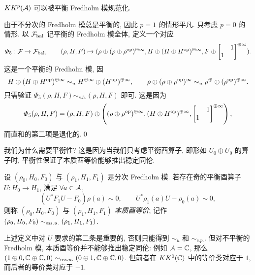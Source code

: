 \begin{Lemma}\label{len:4.1-平衡条件}
	$ KK^p(\mathcal{A}) $ 可以被平衡 Fredholm 模规范化.
\end{Lemma}
\begin{Proof}
	由于不分次的 Fredholm 模总是平衡的, 因此 $ p=1 $ 的情形平凡. 只考虑 $ p=0 $ 的情形. 以 $ \mathcal{F}_{\text{bal}} $ 记平衡的 Fredholm 模全体, 定义一个对应
	\[
		\varPhi_5 : \CF\to\CF_{\text{bal}},\qquad (\rho, H, F)\mapsto(\rho\oplus(\rho\oplus\rho^{\op})^{\oplus\infty}, H\oplus(H\oplus H^{\op})^{\oplus\infty}, F\oplus\mqty[ & 1 \\ 1 &]^{\oplus\infty}).
	\]
	这是一个平衡的 Fredholm 模, 因
	\[
		H\oplus(H\oplus H^{\text{op}})^{\oplus\infty}\sim_u H^{\oplus\infty}\oplus(H^{\text{op}})^{\oplus\infty},\qquad \rho\oplus(\rho\oplus\rho^{\text{op}})^{\infty}\sim_u\rho^{\oplus}\oplus(\rho^{\text{op}})^{\oplus\infty}.
	\]
	只需验证 $ \varPhi_5(\rho, H, F)\sim_{s.h.}(\rho, H, F) $ 即可. 这是因为
	\[
		\varPhi_5(\rho, H, F)=(\rho, H, F)\oplus\left((\rho\oplus\rho^{\op})^{\oplus\infty}, (H\oplus H^{\op})^{\oplus\infty}, \mqty[ & 1 \\ 1 &]^{\oplus\infty}\right),
	\]
	而直和的第二项是退化的.\qed
\end{Proof}

我们为什么需要平衡性? 这是因为当我们只考虑平衡酉算子, 即形如 $ U_0\oplus U_0 $ 的算子时, 平衡性保证了本质酉等价能够推出稳定同伦.

\begin{Definition}[本质酉等价]
	设 $ (\rho_0, H_0, F_0) $ 与 $ (\rho_1, H_1, F_1) $ 是分次 Fredholm 模. 若存在奇的平衡酉算子 $ U : H_0\to H_1 $, 满足 $ \forall a\in\mathcal{A} $,
	\[
		(U^*F_1U-F_0)\rho(a)\sim 0,\qquad U^*\rho_1(a)U-\rho_0(a)\sim 0,
	\]
	则称 $ (\rho_0, H_0, F_0) $ 与 $ (\rho_1, H_1, F_1) $ \emph{本质酉等价}, 记作 $ (\rho_0, H_0, F_0)\sim_{\text{ess}.u.}(\rho_1, H_1, F_1) $.
\end{Definition}

上述定义中对 $ U $ 要求的第二条是重要的, 否则只能得到 $ \sim_u $ 和 $ \sim_{c.p.} $. 但对不平衡的 Fredholm 模, 本质酉等价并不能够推出稳定同伦: 例如 $ \mathcal{A}=\mathbb{C} $, 那么 $ (1\oplus 0,\mathbb{C}\oplus\mathbb{C}, 0)\sim_{\text{ess}.u.}(0\oplus 1,\mathbb{C}\oplus\mathbb{C}, 0) $. 但前者在 $ KK^0(\mathbb{C}) $ 中的等价类对应于 $ 1 $, 而后者的等价类对应于 $ -1 $.

